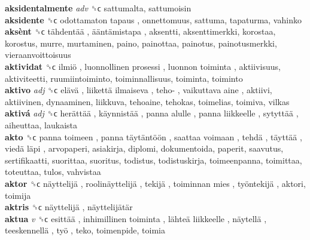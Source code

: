 \textbf{aksidentalmente} \emph{adv}  ␝ϲ  sattumalta, sattumoisin  \\
\textbf{aksidente} ␝ϲ   odottamaton tapaus , onnettomuus, sattuma, tapaturma, vahinko  \\
\textbf{aksènt} ␝ϲ   tähdentää ,  ääntämistapa , aksentti, aksenttimerkki, korostaa, korostus, murre, murtaminen, paino, painottaa, painotus, painotusmerkki, vieraanvoittoisuus  \\
\textbf{aktividat} ␝ϲ   ilmiö ,  luonnollinen prosessi ,  luonnon toiminta , aktiivisuus, aktiviteetti, ruumiintoiminto, toiminnallisuus, toiminta, toiminto  \\
\textbf{aktivo} \emph{adj}  ␝ϲ   elävä ,  liikettä ilmaiseva ,  teho- ,  vaikuttava aine , aktiivi, aktiivinen, dynaaminen, liikkuva, tehoaine, tehokas, toimelias, toimiva, vilkas  \\
\textbf{aktivá} \emph{adj}  ␝ϲ   herättää ,  käynnistää ,  panna alulle ,  panna liikkeelle ,  sytyttää , aiheuttaa, laukaista  \\
\textbf{akto} ␝ϲ   panna toimeen ,  panna täytäntöön ,  saattaa voimaan ,  tehdä ,  täyttää ,  viedä läpi , arvopaperi, asiakirja, diplomi, dokumentoida, paperit, saavutus, sertifikaatti, suorittaa, suoritus, todistus, todistuskirja, toimeenpanna, toimittaa, toteuttaa, tulos, vahvistaa  \\
\textbf{aktor} ␝ϲ   näyttelijä ,  roolinäyttelijä ,  tekijä ,  toiminnan mies ,  työntekijä , aktori, toimija  \\
\textbf{aktris} ␝ϲ   näyttelijä ,  näyttelijätär   \\
\textbf{aktua} \emph{v}  ␝ϲ   esittää ,  inhimillinen toiminta ,  lähteä liikkeelle ,  näytellä ,  teeskennellä ,  työ , teko, toimenpide, toimia  \\
